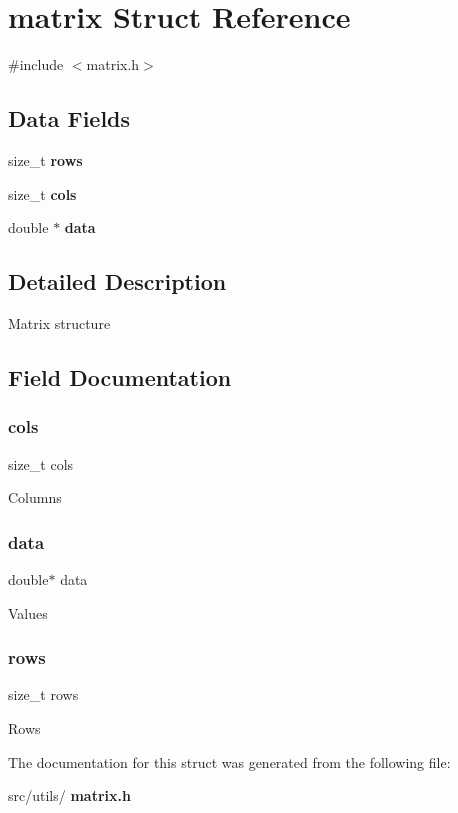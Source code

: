 \section{matrix Struct Reference}
\label{structmatrix}


{\ttfamily \#include $<$matrix.\+h$>$}

\subsection*{Data Fields}
\begin{DoxyCompactItemize}
\item 
size\+\_\+t \textbf{ rows}
\item 
size\+\_\+t \textbf{ cols}
\item 
double $\ast$ \textbf{ data}
\end{DoxyCompactItemize}


\subsection{Detailed Description}
Matrix structure 

\subsection{Field Documentation}
\mbox{\label{structmatrix_a8bc05371b3a4013263f68932ba1b6452}} 
\subsubsection{cols}
{\footnotesize\ttfamily size\+\_\+t cols}

Columns \mbox{\label{structmatrix_a23436a7a2b44939627b59df11be7ad75}} 
\subsubsection{data}
{\footnotesize\ttfamily double$\ast$ data}

Values \mbox{\label{structmatrix_ad161320eba27a8b966baac47bee35c46}} 
\subsubsection{rows}
{\footnotesize\ttfamily size\+\_\+t rows}

Rows 

The documentation for this struct was generated from the following file\+:\begin{DoxyCompactItemize}
\item 
src/utils/\textbf{ matrix.\+h}\end{DoxyCompactItemize}

